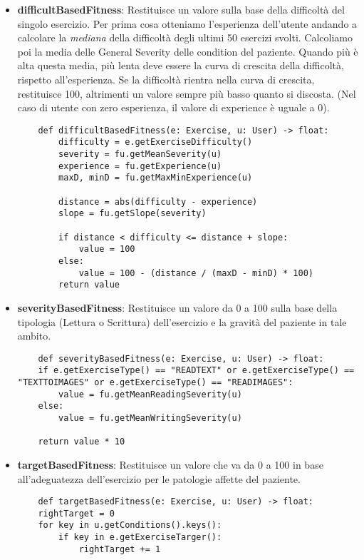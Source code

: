 \documentclass{article}
\begin{document}
\begin{itemize}

\item\textbf{difficultBasedFitness}: Restituisce un valore sulla base della difficoltà del singolo esercizio. Per prima cosa otteniamo l'esperienza dell'utente andando a calcolare la \textit{mediana} della difficoltà degli ultimi 50 esercizi svolti. Calcoliamo poi la media delle General Severity delle condition del paziente. Quando più è alta questa media, più lenta deve essere la curva di crescita della difficoltà, rispetto all'esperienza. Se la difficoltà rientra nella curva di crescita, restituisce 100, altrimenti un valore sempre più basso quanto si discosta. (Nel caso di utente con zero esperienza, il valore di experience è uguale a 0).
\begin{lstlisting}
    def difficultBasedFitness(e: Exercise, u: User) -> float:
        difficulty = e.getExerciseDifficulty()
        severity = fu.getMeanSeverity(u)
        experience = fu.getExperience(u)
        maxD, minD = fu.getMaxMinExperience(u)
    
        distance = abs(difficulty - experience)
        slope = fu.getSlope(severity)
    
        if distance < difficulty <= distance + slope:
            value = 100
        else:
            value = 100 - (distance / (maxD - minD) * 100)
        return value
\end{lstlisting}


\item\textbf{severityBasedFitness}: Restituisce un valore da 0 a 100 sulla base della tipologia (Lettura o Scrittura) dell'esercizio e la gravità del paziente in tale ambito.
\begin{lstlisting}
    def severityBasedFitness(e: Exercise, u: User) -> float:
    if e.getExerciseType() == "READTEXT" or e.getExerciseType() == "TEXTTOIMAGES" or e.getExerciseType() == "READIMAGES":
        value = fu.getMeanReadingSeverity(u)
    else:
        value = fu.getMeanWritingSeverity(u)

    return value * 10
\end{lstlisting}



\item\textbf{targetBasedFitness}: Restituisce un valore che va da 0 a 100 in base all'adeguatezza dell'esercizio per le patologie affette del paziente.
\begin{lstlisting}
    def targetBasedFitness(e: Exercise, u: User) -> float:
    rightTarget = 0
    for key in u.getConditions().keys():
        if key in e.getExerciseTarger():
            rightTarget += 1


\end{lstlisting}
\end{itemize}
\end{document}
